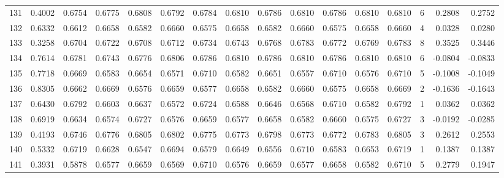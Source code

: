 \begin{tabular}{lrrrrrrrrrrrrrrr}
131 &      0.4002 &  0.6754 &  0.6775 &  0.6808 &  0.6792 &  0.6784 &  0.6810 &  0.6786 &  0.6810 &  0.6786 &   0.6810 &     0.6810 &      6 &                    0.2808 &                     0.2752 \\
132 &      0.6332 &  0.6612 &  0.6658 &  0.6582 &  0.6660 &  0.6575 &  0.6658 &  0.6582 &  0.6660 &  0.6575 &   0.6658 &     0.6660 &      4 &                    0.0328 &                     0.0280 \\
133 &      0.3258 &  0.6704 &  0.6722 &  0.6708 &  0.6712 &  0.6734 &  0.6743 &  0.6768 &  0.6783 &  0.6772 &   0.6769 &     0.6783 &      8 &                    0.3525 &                     0.3446 \\
134 &      0.7614 &  0.6781 &  0.6743 &  0.6776 &  0.6806 &  0.6786 &  0.6810 &  0.6786 &  0.6810 &  0.6786 &   0.6810 &     0.6810 &      6 &                   -0.0804 &                    -0.0833 \\
135 &      0.7718 &  0.6669 &  0.6583 &  0.6654 &  0.6571 &  0.6710 &  0.6582 &  0.6651 &  0.6557 &  0.6710 &   0.6576 &     0.6710 &      5 &                   -0.1008 &                    -0.1049 \\
136 &      0.8305 &  0.6662 &  0.6669 &  0.6576 &  0.6659 &  0.6577 &  0.6658 &  0.6582 &  0.6660 &  0.6575 &   0.6658 &     0.6669 &      2 &                   -0.1636 &                    -0.1643 \\
137 &      0.6430 &  0.6792 &  0.6603 &  0.6637 &  0.6572 &  0.6724 &  0.6588 &  0.6646 &  0.6568 &  0.6710 &   0.6582 &     0.6792 &      1 &                    0.0362 &                     0.0362 \\
138 &      0.6919 &  0.6634 &  0.6574 &  0.6727 &  0.6576 &  0.6659 &  0.6577 &  0.6658 &  0.6582 &  0.6660 &   0.6575 &     0.6727 &      3 &                   -0.0192 &                    -0.0285 \\
139 &      0.4193 &  0.6746 &  0.6776 &  0.6805 &  0.6802 &  0.6775 &  0.6773 &  0.6798 &  0.6773 &  0.6772 &   0.6783 &     0.6805 &      3 &                    0.2612 &                     0.2553 \\
140 &      0.5332 &  0.6719 &  0.6628 &  0.6547 &  0.6694 &  0.6579 &  0.6649 &  0.6556 &  0.6710 &  0.6583 &   0.6653 &     0.6719 &      1 &                    0.1387 &                     0.1387 \\
141 &      0.3931 &  0.5878 &  0.6577 &  0.6659 &  0.6569 &  0.6710 &  0.6576 &  0.6659 &  0.6577 &  0.6658 &   0.6582 &     0.6710 &      5 &                    0.2779 &                     0.1947 \\

\end{tabular}
